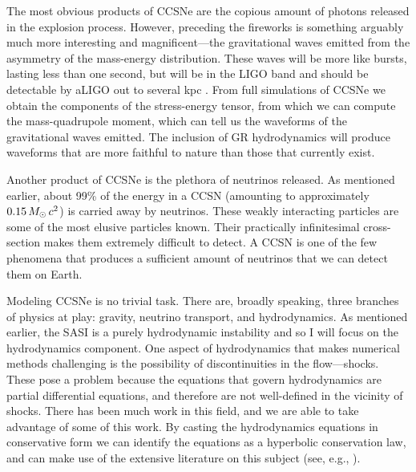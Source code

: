 The most obvious products of CCSNe are the copious amount of photons
released in the explosion process.
However, preceding the fireworks is something arguably much more interesting
and magnificent---the gravitational waves emitted from the asymmetry of the
mass-energy distribution.
These waves will be more like bursts, lasting less than one second,
but will be in the LIGO band and should be detectable by aLIGO
out to several kpc \citep{aaa2016}.
From full simulations of CCSNe we obtain the components of the stress-energy
tensor, from which we can compute the mass-quadrupole moment,
which can tell us the waveforms of the gravitational waves emitted.
The inclusion of GR hydrodynamics will produce waveforms that are more
faithful to nature than those that currently exist.

Another product of CCSNe is the plethora of neutrinos released.
As mentioned earlier, about 99\% of the energy in a CCSN
(amounting to approximately $0.15\,M_{\odot}\,c^{2}$) is carried away by neutrinos.
These weakly interacting particles are some of the most elusive particles known.
Their practically infinitesimal cross-section makes them extremely difficult
to detect.
A CCSN is one of the few phenomena that produces a sufficient amount of
neutrinos that we can detect them on Earth.

Modeling CCSNe is no trivial task.
There are, broadly speaking, three branches of physics at play:
gravity, neutrino transport, and hydrodynamics.
As mentioned earlier, the SASI is a purely hydrodynamic instability and so
I will focus on the hydrodynamics component.
One aspect of hydrodynamics that makes numerical methods challenging is the
possibility of discontinuities in the flow---shocks.
These pose a problem because the equations that govern hydrodynamics are
partial differential equations, and therefore are not well-defined in the
vicinity of shocks.
There has been much work in this field, and we are able to take advantage of
some of this work.
By casting the hydrodynamics equations in conservative form we can identify
the equations as a hyperbolic conservation law, and can make use of the
extensive literature on this subject (see, e.g., \citet{l2002}).

